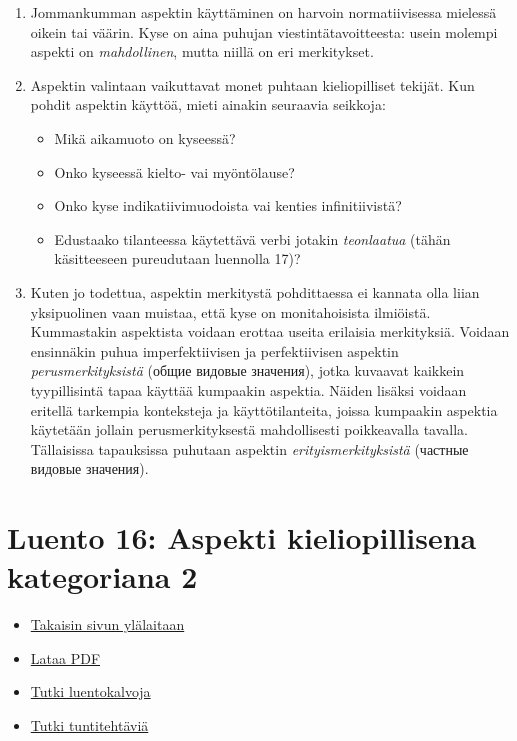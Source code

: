 \documentclass[]{scrartcl}
\providecommand{\tightlist}{%
  \setlength{\itemsep}{0pt}\setlength{\parskip}{0pt}}
\begin{document}
\begin{enumerate}
\def\labelenumi{\arabic{enumi}.}
\tightlist
\item
  Jommankumman aspektin käyttäminen on harvoin normatiivisessa mielessä
  oikein tai väärin. Kyse on aina puhujan viestintätavoitteesta: usein
  molempi aspekti on \emph{mahdollinen}, mutta niillä on eri
  merkitykset.
\item
  Aspektin valintaan vaikuttavat monet puhtaan kieliopilliset tekijät.
  Kun pohdit aspektin käyttöä, mieti ainakin seuraavia seikkoja:

  \begin{itemize}
  \tightlist
  \item
    Mikä aikamuoto on kyseessä?
  \item
    Onko kyseessä kielto- vai myöntölause?
  \item
    Onko kyse indikatiivimuodoista vai kenties infinitiivistä?
  \item
    Edustaako tilanteessa käytettävä verbi jotakin \emph{teonlaatua}
    (tähän käsitteeseen pureudutaan luennolla 17)?
  \end{itemize}
\item
  Kuten jo todettua, aspektin merkitystä pohdittaessa ei kannata olla
  liian yksipuolinen vaan muistaa, että kyse on monitahoisista
  ilmiöistä. Kummastakin aspektista voidaan erottaa useita erilaisia
  merkityksiä. Voidaan ensinnäkin puhua imperfektiivisen ja
  perfektiivisen aspektin \emph{perusmerkityksistä} (общие видовые
  значения), jotka kuvaavat kaikkein tyypillisintä tapaa käyttää
  kumpaakin aspektia. Näiden lisäksi voidaan eritellä tarkempia
  konteksteja ja käyttötilanteita, joissa kumpaakin aspektia käytetään
  jollain perusmerkityksestä mahdollisesti poikkeavalla tavalla.
  Tällaisissa tapauksissa puhutaan aspektin \emph{erityismerkityksistä}
  (частные видовые значения).
\end{enumerate}

\section{Luento 16: Aspekti kieliopillisena kategoriana
2}\label{luento-16-aspekti-kieliopillisena-kategoriana-2}

\begin{itemize}
\tightlist
\item
  \href{https://mustikka.uta.fi/~juho_harme/morfologia/\#tästä-kurssista}{Takaisin
  sivun ylälaitaan}
\item
  \href{http://mustikka.uta.fi/~juho_harme/morfologia/materiaalit/luento16.pdf}{Lataa
  PDF}
\item
  \href{http://mustikka.uta.fi/~juho_harme/morfologia/presentations/luento16.html}{Tutki
  luentokalvoja}
\item
  \href{http://mustikka.uta.fi/~juho_harme/morfologia/tehtavat/luento16.pdf}{Tutki
  tuntitehtäviä}
\end{itemize}
\end{document}
